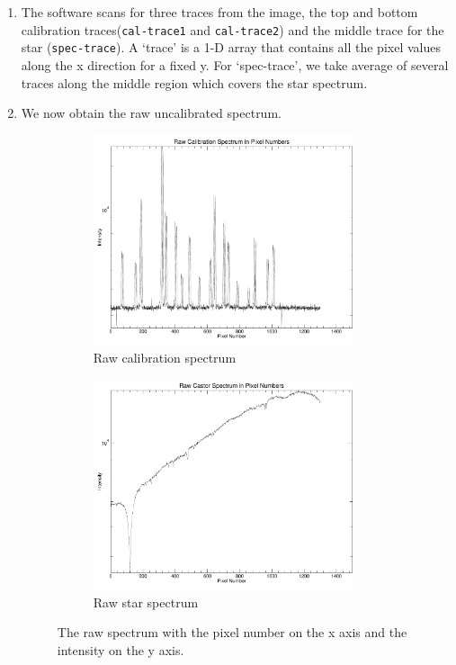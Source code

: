 \documentclass[12pt,a4paper]{article}
\begin{document}
      \begin{enumerate}
        \item The software scans for three traces from the image, the top and bottom calibration traces(\texttt{cal-trace1} and \texttt{cal-trace2}) and the middle trace for the star (\texttt{spec-trace}). A `trace' is a 
              1-D array that contains all the pixel values along the x direction for a fixed y. For `spec-trace', we take average of several traces along the middle region which covers the star spectrum. 
        \item We now obtain the raw uncalibrated spectrum.
          \begin{figure}[H]
            \centering
            \begin{subfigure}{0.49\textwidth}
              \centering
              \includegraphics[width=3in]{Pictures/Castor_121sec_2025_2-CalRawSpec.pdf}
              \caption{Raw calibration spectrum}
              \label{fig:rawcalspec}  
            \end{subfigure}
            \begin{subfigure}{0.49\textwidth}
              \centering
              \includegraphics[width=3in]{Pictures/Castor_121sec_2025_2-RawSpec.pdf}
              \caption{Raw star spectrum}
              \label{fig:rawstarspec}
            \end{subfigure}
            \caption{The raw spectrum with the pixel number on the x axis and the intensity on the y axis. }
          \end{figure}


\end{enumerate}
\end{document}
